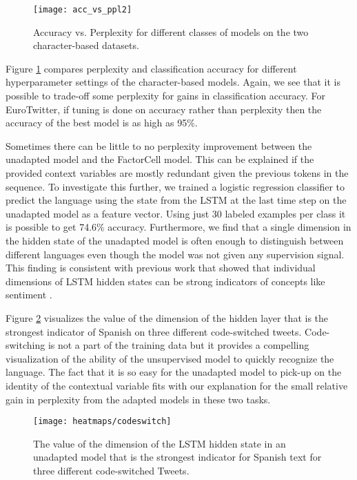 \begin{figure}[ht]
\centering
\texttt{[image: acc\_vs\_ppl2]}
\caption{Accuracy vs. Perplexity for different classes of models on the two character-based datasets.}
\label{fig:acc_vs_ppl2}
\end{figure}

Figure \ref{fig:acc_vs_ppl2} compares perplexity and classification accuracy for different hyperparameter settings of the character-based models. Again, we see that it is possible to trade-off some perplexity for gains in classification accuracy. For EuroTwitter, if tuning is done on accuracy rather than perplexity then the accuracy of the best model is as high as 95\%.

Sometimes there can be little to no perplexity improvement between the unadapted model and the FactorCell model. This can be explained if the provided context variables are mostly redundant given the previous tokens in the sequence. To investigate this further, we trained a logistic regression classifier to predict the language using the state from the LSTM at the last time step on the unadapted model as a feature vector. Using just 30 labeled examples per class it is possible to get 74.6\% accuracy. Furthermore, we find that a single dimension in the hidden state of the unadapted model is often enough to distinguish between different languages even though the model was not given any supervision signal. This finding is consistent with previous work that showed that individual dimensions of LSTM hidden states can be strong indicators of concepts like sentiment \cite{karpathy2015visualizing,radford2017}. 

Figure \ref{fig:heatmap} visualizes the value of the dimension of the hidden layer that is the strongest indicator of Spanish on three different code-switched tweets. Code-switching is not a part of the training data but it provides a compelling visualization of the ability of the unsupervised model to quickly recognize the language. The fact that it is so easy for the unadapted model to pick-up on the identity of the contextual variable fits with our explanation for the small relative gain in perplexity from the adapted models in these two tasks.

\begin{figure}[ht]
\centering
\texttt{[image: heatmaps/codeswitch]}
\caption{The value of the dimension of the LSTM hidden state in an unadapted model that is the strongest indicator for Spanish text for three different code-switched Tweets.}
\label{fig:heatmap}
\end{figure}